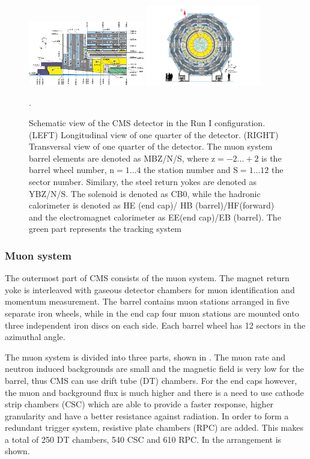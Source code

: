 \begin{figure}[ht!]
	\centering
	\includegraphics[width=0.45\textwidth]{2_ExperimentalSetup/Figures/cmsview1}
	\includegraphics[width=0.45\textwidth]{2_ExperimentalSetup/Figures/cmsview}
 \caption{Schematic view of the CMS detector in the Run I configuration. (LEFT) Longitudinal view of one quarter of the detector. (RIGHT)  Transversal view of one quarter of the detector. The muon system barrel elements are denoted as MBZ/N/S, where z$=-2...+2$ is the barrel wheel number, n$=1...4$ the station number and S$=1...12$ the sector number. Similary, the steel return yokes are denoted as YBZ/N/S. The solenoid is denoted as CB0, while the hadronic calorimeter is denoted as HE (end cap)/ HB (barrel)/HF(forward) and the electromagnet calorimeter as EE(end cap)/EB (barrel). The green part represents the tracking system\cite{Chatrchyan:1223944}}.
	\label{fig:CMSview}
\end{figure}

\subsubsection{Muon system}
The outermost part of CMS consists of the muon system. The magnet return yoke is interleaved with gaseous detector chambers for muon identification and momentum measurement. The barrel contains muon stations arranged in five separate iron wheels, while in the end cap four muon stations are mounted onto three independent iron discs on each side. Each barrel wheel has 12 sectors in the azimuthal angle. 

The muon system is divided into three parts, shown in \cite{Chatrchyan:1223944}. The muon rate and neutron induced backgrounds are small and the magnetic field is very low for the barrel, thus CMS can use drift tube (DT) chambers. For the end caps however, the muon and background flux is much higher and there is a need to use cathode strip chambers (CSC) which are able to provide a faster response, higher granularity and have a better resistance against radiation. In order to form a redundant trigger system, resistive plate chambers (RPC) are added. This makes a total of 250 DT chambers, 540 CSC and 610 RPC. In  the arrangement is shown.


